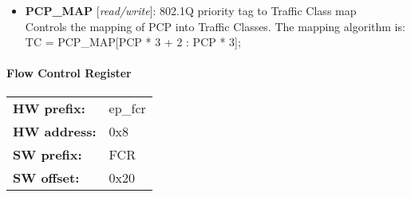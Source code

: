 \vspace{12pt}
\noindent
{}

\begin{itemize}
\item \begin{small}
{\bf 
PCP\_MAP
} [\emph{read/write}]: 802.1Q priority tag to Traffic Class map
\\
Controls the mapping of PCP into Traffic Classes. The mapping algorithm                          is: TC = PCP\_MAP[PCP * 3 + 2 : PCP * 3]; 
\end{small}
\end{itemize}
\paragraph*{Flow Control Register}\vspace{12pt}

\begin{tabular}{l l }
{\bf HW prefix:}  & ep\_fcr\\
{\bf HW address:}  & 0x8\\
{\bf SW prefix:}  & FCR\\
{\bf SW offset:}  & 0x20\\
\end{tabular}

